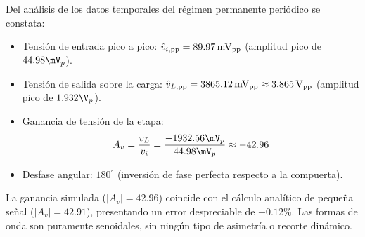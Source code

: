 Del análisis de los datos temporales del régimen permanente periódico se constata:
\begin{itemize}
  \item Tensión de entrada pico a pico: $\hat{v}_{i,\mathrm{pp}} = 89.97\,\mathrm{mV}_{\mathrm{pp}}$ (amplitud pico de $44.98\mV_p$).
  \item Tensión de salida sobre la carga: $\hat{v}_{L,\mathrm{pp}} = 3865.12\,\mathrm{mV}_{\mathrm{pp}} \approx 3.865\,\mathrm{V}_{\mathrm{pp}}$ (amplitud pico de $1.932\V_p$).
  \item Ganancia de tensión de la etapa:
    \begin{equation}
      A_v = \frac{v_L}{v_i} = \frac{-1932.56\mV_p}{44.98\mV_p} \approx -42.96
      \label{eq:Av_simulada}
    \end{equation}
  \item Desfase angular: $180^\circ$ (inversión de fase perfecta respecto a la compuerta).
\end{itemize}

La ganancia simulada ($|A_v| = 42.96$) coincide con el cálculo analítico de pequeña señal
($|A_v| = 42.91$), presentando un error despreciable de $+0.12\%$. Las formas de onda son puramente senoidales,
sin ningún tipo de asimetría o recorte dinámico.
